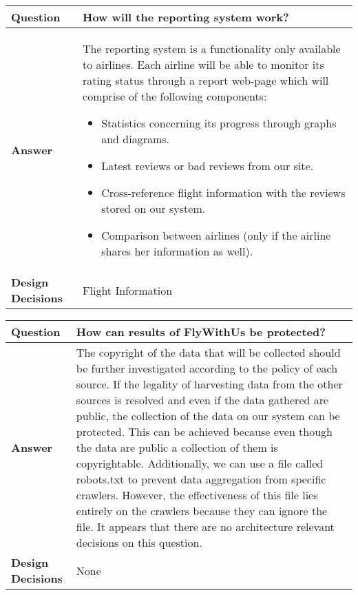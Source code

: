 \clearpage

\begin{longtable}{| l |  p{12cm} |}
\hline
\textbf{Question} & \textbf{How will the reporting system work?} \\ \hline
\textbf{Answer} &
	The reporting system is a functionality only available to airlines. Each airline will be able to monitor its rating status through a report web-page which will comprise of the following components:
	\begin{itemize}
	\item Statistics concerning its progress through graphs and diagrams.
	\item Latest reviews or bad reviews from our site.
	\item Cross-reference flight information with the reviews stored on our system.
	\item Comparison between airlines (only if the airline shares her information as well).
	\end{itemize}
 \\ \hline
\textbf{Design Decisions} & Flight Information \\ \hline
\end{longtable}

\begin{longtable}{| l |  p{12cm} |}
\hline
\textbf{Question} & \textbf{How can results of FlyWithUs be protected?} \\ \hline
\textbf{Answer} &
	The copyright of the data that will be collected should be further investigated according to the policy of each source. If the legality of harvesting data from the other sources is resolved and even if the data gathered are public, the collection of the data on our system can be protected. This can be achieved because even though the data are public a collection of them is copyrightable. Additionally, we can use a file called robots.txt to prevent data aggregation from specific crawlers. However, the effectiveness of this file lies entirely on the crawlers because they can ignore the file. It appears that there are no architecture relevant decisions on this question.
 \\ \hline
\textbf{Design Decisions} & None \\ \hline
\end{longtable}

